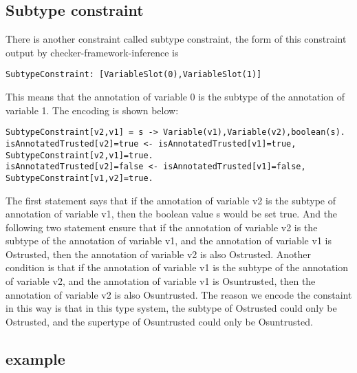 \documentclass{article}
\begin{document}
\subsection{Subtype constraint}
There is another constraint called subtype constraint, the form of this constraint output by checker-framework-inference is 
\begin{lstlisting}
SubtypeConstraint: [VariableSlot(0),VariableSlot(1)] 
\end{lstlisting}
This means that the annotation of variable 0 is the subtype of the annotation of variable 1.  The encoding is shown below:
\begin{lstlisting}[breaklines=true]
SubtypeConstraint[v2,v1] = s -> Variable(v1),Variable(v2),boolean(s).
isAnnotatedTrusted[v2]=true <- isAnnotatedTrusted[v1]=true, SubtypeConstraint[v2,v1]=true.
isAnnotatedTrusted[v2]=false <- isAnnotatedTrusted[v1]=false, SubtypeConstraint[v1,v2]=true.
\end{lstlisting}
The first statement says that if the annotation of variable v2 is the subtype of annotation of variable v1, then the boolean value s would be set true.
And the following two statement ensure that if the annotation of variable v2 is the subtype of the annotation of variable v1, and the annotation of variable v1 is Ostrusted, then the annotation of variable v2 is also Ostrusted.  Another condition is that if the annotation of variable v1 is the subtype of the annotation of variable v2, and the annotation of variable v1 is Osuntrusted, then the annotation of variable v2 is also Osuntrusted.  The reason we encode the constaint in this way is that in this type system, the subtype of Ostrusted could only be Ostrusted, and the supertype of Osuntrusted could only be Osuntrusted.

\subsection{example}
\end{document}
